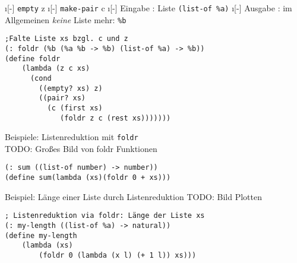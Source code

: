 \begin{itemize}
	\i[-] \lstinline|empty| \eval z
	\i[-] \lstinline|make-pair| \eval c
	\i[-] Eingabe : Liste \lstinline|(list-of %a)|
	\i[-] Ausgabe : im Allgemeinen \emph{keine} Liste mehr: \lstinline|%b|
\end{itemize}
\begin{lstlisting}
;Falte Liste xs bzgl. c und z
(: foldr (%b (%a %b -> %b) (list-of %a) -> %b))
(define foldr
	(lambda (z c xs)
	  (cond 
	    ((empty? xs) z)
	    ((pair? xs)
	      (c (first xs)
	         (foldr z c (rest xs)))))))
\end{lstlisting}
Beispiele: Listenreduktion mit \lstinline|foldr|\\
TODO: Gro\ss es Bild von foldr Funktionen
\begin{lstlisting}
(: sum ((list-of number) -> number))
(define sum(lambda (xs)(foldr 0 + xs)))
\end{lstlisting}
Beispiel: Länge einer Liste durch Listenreduktion
TODO: Bild Plotten
\begin{lstlisting}
; Listenreduktion via foldr: Länge der Liste xs
(: my-length ((list-of %a) -> natural))
(define my-length
	(lambda (xs)
		(foldr 0 (lambda (x l) (+ 1 l)) xs)))
\end{lstlisting}
